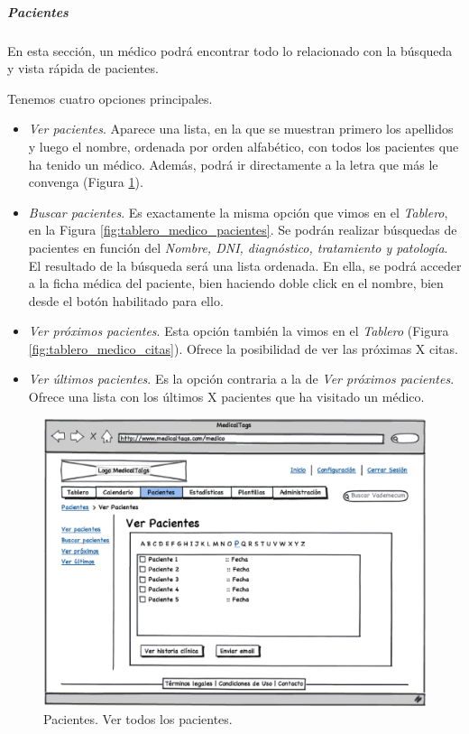 \documentclass[a4paper,oneside,11pt]{book}
\begin{document}
		\smallskip
		\subparagraph{Pacientes} %
		\label{par:medico_pacientes}
		
		En esta sección, un médico podrá encontrar todo lo relacionado con la búsqueda y vista rápida de pacientes.
		
		Tenemos cuatro opciones principales.
		
		\begin{itemize}
			\item \textit{Ver pacientes}. Aparece una lista, en la que se muestran primero los apellidos y luego el nombre, ordenada por orden alfabético, con todos los pacientes que ha tenido un médico. Además, podrá ir directamente a la letra que más le convenga (Figura \ref{fig:pacientes_medico}).
			\item \textit{Buscar pacientes}. Es exactamente la misma opción que vimos en el \textit{Tablero}, en la Figura \ref{fig:tablero_medico_pacientes}. Se podrán realizar búsquedas de pacientes en función del \textit{Nombre, DNI, diagnóstico, tratamiento y patología}. El resultado de la búsqueda será una lista ordenada. En ella, se podrá acceder a la ficha médica del paciente, bien haciendo doble click en el nombre, bien desde el botón habilitado para ello.
			\item \textit{Ver próximos pacientes}. Esta opción también la vimos en el \textit{Tablero} (Figura \ref{fig:tablero_medico_citas}). Ofrece la posibilidad de ver las próximas X citas.
			\item \textit{Ver últimos pacientes}. Es la opción contraria a la de \textit{Ver próximos pacientes}. Ofrece una lista con los últimos X pacientes que ha visitado un médico. 
		\end{itemize}
			
		\begin{figure}[H]
		  \centering
		    \includegraphics[width=12cm]{img/eps/17_Pacientes_Medico.eps}
		  \caption{Pacientes. Ver todos los pacientes.}
		  \label{fig:pacientes_medico}
		\end{figure}
		
\end{document}
